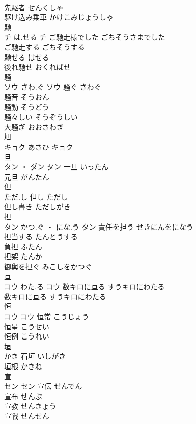 \documentclass[8pt]{extreport}
\begin{document}
\begin{CJK}{UTF8}{min}
\\	先駆者	せんくしゃ	
\\	駆け込み乗車	かけこみじょうしゃ	
\\	馳	
\\	チ	は.せる	チ	ご馳走様でした	ごちそうさまでした	
\\	ご馳走する	ごちそうする	
\\	馳せる	はせる	
\\	後れ馳せ	おくればせ	
\\	騒	
\\	ソウ	さわ.ぐ	ソウ	騒ぐ	さわぐ	
\\	騒音	そうおん	
\\	騒動	そうどう	
\\	騒々しい	そうぞうしい	
\\	大騒ぎ	おおさわぎ	
\\	旭	
\\	キョク	あさひ	キョク																																			
\\	旦	
\\	タン ・ ダン		タン	一旦	いったん	
\\	元旦	がんたん	
\\	但	
\\	ただ.し		但し	ただし	
\\	但し書き	ただしがき	
\\	担	
\\	タン	かつ.ぐ ・ にな.う	タン	責任を担う	せきにんをになう	
\\	担当する	たんとうする	
\\	負担	ふたん	
\\	担架	たんか	
\\	御輿を担ぐ	みこしをかつぐ	
\\	亘	
\\	コウ	わた.る	コウ	数キロに亘る	すうキロにわたる	
\\	数キロに亘る	すうキロにわたる	
\\	恒	
\\	コウ		コウ	恒常	こうじょう	
\\	恒星	こうせい	
\\	恒例	こうれい	
\\	垣	
\\	かき		石垣	いしがき	
\\	垣根	かきね	
\\	宣	
\\	セン		セン	宣伝	せんでん	
\\	宣布	せんぷ	
\\	宣教	せんきょう	
\\	宣戦	せんせん	

\end{CJK}
\end{document}
